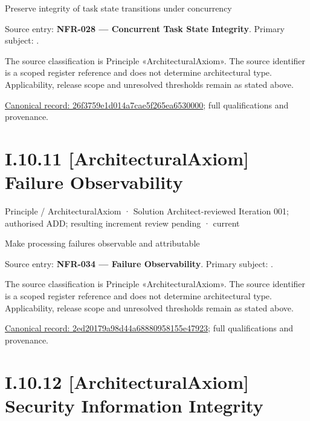 Preserve integrity of task state transitions under concurrency



Source entry: \textbf{NFR-028 — Concurrent Task State Integrity}. Primary subject: \texttt{}.



The source classification is Principle «ArchitecturalAxiom». The source identifier is a scoped register reference and does not determine architectural type. Applicability, release scope and unresolved thresholds remain as stated above.


{\footnotesize \href{../../../../../../../continuum/motivation/principle/architectural-axiom/26f3759e1d014a7cae5f265ea6530000.md}{Canonical record: 26f3759e1d014a7cae5f265ea6530000}; full qualifications and provenance.}\par
\section*{I.10.11 [ArchitecturalAxiom] Failure Observability}
\label{navigation:I.10.11}

\label{element:2ed20179a98d44a68880958155e47923}
{\small Principle / ArchitecturalAxiom · Solution Architect-reviewed Iteration 001; authorised ADD; resulting increment review pending · current}\par

Make processing failures observable and attributable



Source entry: \textbf{NFR-034 — Failure Observability}. Primary subject: \texttt{}.



The source classification is Principle «ArchitecturalAxiom». The source identifier is a scoped register reference and does not determine architectural type. Applicability, release scope and unresolved thresholds remain as stated above.


{\footnotesize \href{../../../../../../../continuum/motivation/principle/architectural-axiom/2ed20179a98d44a68880958155e47923.md}{Canonical record: 2ed20179a98d44a68880958155e47923}; full qualifications and provenance.}\par
\section*{I.10.12 [ArchitecturalAxiom] Security Information Integrity}
\label{navigation:I.10.12}

